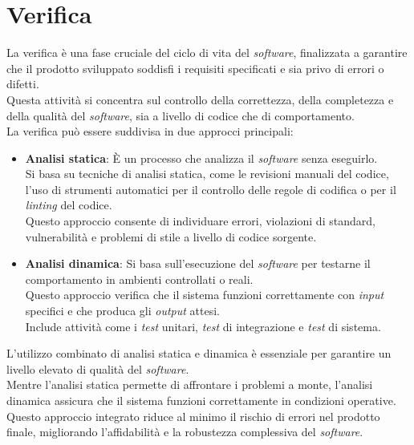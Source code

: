 \section{Verifica}
\label{sez:verifica}

La verifica è una fase cruciale del ciclo di vita del \textit{software}, finalizzata a garantire che il prodotto sviluppato soddisfi i requisiti specificati e sia privo di errori o difetti.\\
Questa attività si concentra sul controllo della correttezza, della completezza e della qualità del \textit{software}, sia a livello di codice che di comportamento.\\

\noindent La verifica può essere suddivisa in due approcci principali:

\begin{itemize}
\item \textbf{Analisi statica}:
È un processo che analizza il \textit{software} senza eseguirlo. \\
Si basa su tecniche di analisi statica, come le revisioni manuali del codice, l'uso di strumenti automatici per il controllo delle regole di codifica o per il \textit{linting} del codice. \\
Questo approccio consente di individuare errori, violazioni di standard, vulnerabilità e problemi di stile a livello di codice sorgente.  

\item \textbf{Analisi dinamica}:
Si basa sull’esecuzione del \textit{software} per testarne il comportamento in ambienti controllati o reali.\\
Questo approccio verifica che il sistema funzioni correttamente con \textit{input} specifici e che produca gli \textit{output} attesi. \\
Include attività come i \textit{test} unitari, \textit{test} di integrazione e \textit{test} di sistema.  
\end{itemize}

\noindent L’utilizzo combinato di analisi statica e dinamica è essenziale per garantire un livello elevato di qualità del \textit{software}. \\
Mentre l'analisi statica permette di affrontare i problemi a monte, l'analisi dinamica assicura che il sistema funzioni correttamente in condizioni operative. \\
Questo approccio integrato riduce al minimo il rischio di errori nel prodotto finale, migliorando l'affidabilità e la robustezza complessiva del \textit{software}.

